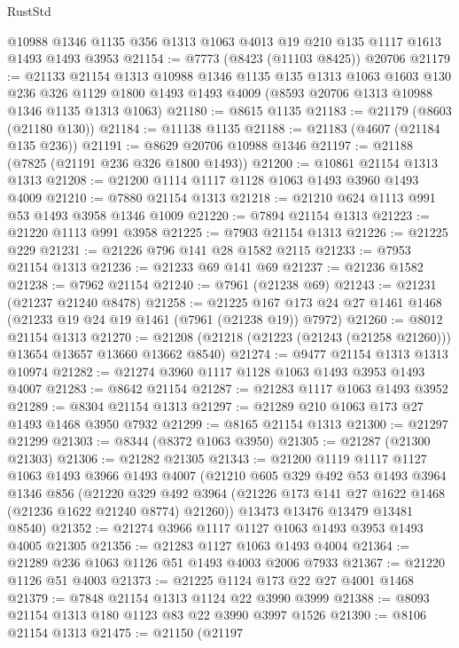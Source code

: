 \begin{lexlean}{RustStd}
\begin{coremodule}
    @10988
    @1346
    @1135
    @356
    @1313
    @1063
    @4013
    @19
    @210
    @135
    @1117
    @1613
    @1493
    @1493
    @3953
@21154 := @7773 (@8423 (@11103 @8425)) @20706
@21179 := @21133
    @21154
    @1313
    @10988
    @1346
    @1135
    @135
    @1313
    @1063
    @1603
    @130
    @236
    @326
    @1129
    @1800
    @1493
    @1493
    @4009
    (@8593 @20706 @1313 @10988 @1346 @1135 @1313 @1063)
@21180 := @8615 @1135
@21183 := @21179 (@8603 (@21180 @130))
@21184 := @11138 @1135
@21188 := @21183 (@4607 (@21184 @135 @236))
@21191 := @8629 @20706 @10988 @1346
@21197 := @21188 (@7825 (@21191 @236 @326 @1800 @1493))
@21200 := @10861 @21154 @1313 @1313
@21208 := @21200 @1114 @1117 @1128 @1063 @1493 @3960 @1493 @4009
@21210 := @7880 @21154 @1313
@21218 := @21210 @624 @1113 @991 @53 @1493 @3958 @1346 @1009
@21220 := @7894 @21154 @1313
@21223 := @21220 @1113 @991 @3958
@21225 := @7903 @21154 @1313
@21226 := @21225 @229
@21231 := @21226 @796 @141 @28 @1582 @2115
@21233 := @7953 @21154 @1313
@21236 := @21233 @69 @141 @69
@21237 := @21236 @1582
@21238 := @7962 @21154
@21240 := @7961 (@21238 @69)
@21243 := @21231 (@21237 @21240 @8478)
@21258 := @21225 @167 @173 @24 @27 @1461 @1468 (@21233 @19 @24 @19 @1461 (@7961 (@21238 @19)) @7972)
@21260 := @8012 @21154 @1313
@21270 := @21208 (@21218 (@21223 (@21243 (@21258 @21260))) @13654 @13657 @13660 @13662 @8540)
@21274 := @9477 @21154 @1313 @1313 @10974
@21282 := @21274 @3960 @1117 @1128 @1063 @1493 @3953 @1493 @4007
@21283 := @8642 @21154
@21287 := @21283 @1117 @1063 @1493 @3952
@21289 := @8304 @21154 @1313
@21297 := @21289 @210 @1063 @173 @27 @1493 @1468 @3950 @7932
@21299 := @8165 @21154 @1313
@21300 := @21297 @21299
@21303 := @8344 (@8372 @1063 @3950)
@21305 := @21287 (@21300 @21303)
@21306 := @21282 @21305
@21343 := @21200
    @1119
    @1117
    @1127
    @1063
    @1493
    @3966
    @1493
    @4007
    (@21210
      @605
      @329
      @492
      @53
      @1493
      @3964
      @1346
      @856
      (@21220 @329 @492 @3964 (@21226 @173 @141 @27 @1622 @1468 (@21236 @1622 @21240 @8774) @21260))
      @13473
      @13476
      @13479
      @13481
      @8540)
@21352 := @21274 @3966 @1117 @1127 @1063 @1493 @3953 @1493 @4005 @21305
@21356 := @21283 @1127 @1063 @1493 @4004
@21364 := @21289 @236 @1063 @1126 @51 @1493 @4003 @2006 @7933
@21367 := @21220 @1126 @51 @4003
@21373 := @21225 @1124 @173 @22 @27 @4001 @1468
@21379 := @7848 @21154 @1313 @1124 @22 @3990 @3999
@21388 := @8093 @21154 @1313 @180 @1123 @83 @22 @3990 @3997 @1526
@21390 := @8106 @21154 @1313
@21475 := @21150
    (@21197

\end{coremodule}
\end{lexlean}

